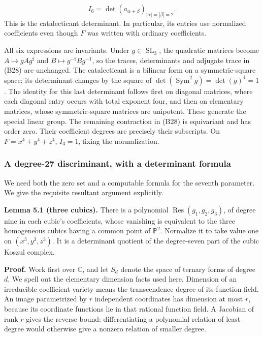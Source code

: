 \documentclass[
]{article}
\begin{document}
\[
I_6=\det(a_{\alpha+\beta})_{|\alpha|=|\beta|=2}.
\tag{B29}
\] This is the catalecticant determinant. In particular, its entries use
normalized coefficients even though \(F\) was written with ordinary
coefficients.

All six expressions are invariants. Under \(g\in\operatorname{SL}_3\),
the quadratic matrices become \(A\mapsto gAg^{\mathsf t}\) and
\(B\mapsto g^{-\mathsf t}Bg^{-1}\), so the traces, determinants and
adjugate trace in (B28) are unchanged. The catalecticant is a bilinear
form on a symmetric-square space; its determinant changes by the square
of \(\det(\operatorname{Sym}^2g)=\det(g)^4=1\). The identity for this
last determinant follows first on diagonal matrices, where each diagonal
entry occurs with total exponent four, and then on elementary matrices,
whose symmetric-square matrices are unipotent. These generate the
special linear group. The remaining contraction in (B28) is equivariant
and has order zero. Their coefficient degrees are precisely their
subscripts. On \(F=x^4+y^4+z^4\), \(I_3=1\), fixing the normalization.

\subsubsection{A degree-27 discriminant, with a determinant
formula}\label{a-degree-27-discriminant-with-a-determinant-formula}

We need both the zero set and a computable formula for the seventh
parameter. We give the requisite resultant argument explicitly.

\protect{}\label{lemma-5-1}{}

\textbf{Lemma 5.1 (three cubics).} There is a polynomial
\(\operatorname{Res}(g_1,g_2,g_3)\), of degree nine in each cubic's
coefficients, whose vanishing is equivalent to the three homogeneous
cubics having a common point of \(\mathbb P^2\). Normalize it to take
value one on \((x^3,y^3,z^3)\). It is a determinant quotient of the
degree-seven part of the cubic Koszul complex.

\textbf{Proof.} Work first over \(\mathbb C\), and let \(S_d\) denote
the space of ternary forms of degree \(d\). We spell out the elementary
dimension facts used here. Dimension of an irreducible coefficient
variety means the transcendence degree of its function field. An image
parametrized by \(r\) independent coordinates has dimension at most
\(r\), because its coordinate functions lie in that rational function
field. A Jacobian of rank \(r\) gives the reverse bound: differentiating
a polynomial relation of least degree would otherwise give a nonzero
relation of smaller degree.
\end{document}
